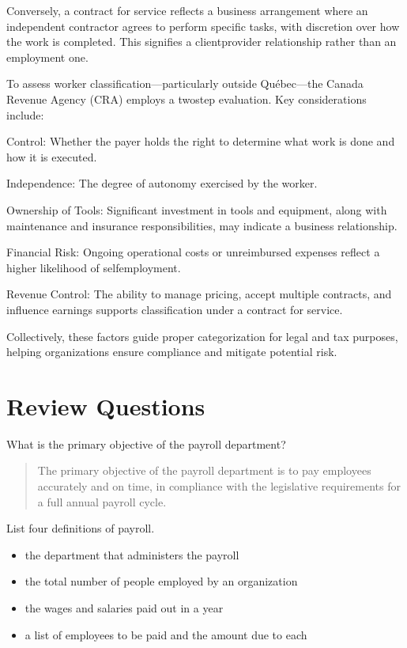 \documentclass[letterpaper,10pt,english]{sphinxmanual}
\begin{document}
\sphinxAtStartPar
Conversely, a contract for service reflects a business arrangement where an independent contractor agrees to perform specific
tasks, with discretion over how the work is completed. This signifies a client\sphinxhyphen{}provider relationship rather than an employment
one.

\sphinxAtStartPar
To assess worker classification—particularly outside Québec—the Canada Revenue Agency (CRA) employs a two\sphinxhyphen{}step evaluation. Key
considerations include:

\sphinxAtStartPar
Control: Whether the payer holds the right to determine what work is done and how it is executed.

\sphinxAtStartPar
Independence: The degree of autonomy exercised by the worker.

\sphinxAtStartPar
Ownership of Tools: Significant investment in tools and equipment, along with maintenance and insurance responsibilities, may indicate a business relationship.

\sphinxAtStartPar
Financial Risk: Ongoing operational costs or unreimbursed expenses reflect a higher likelihood of self\sphinxhyphen{}employment.

\sphinxAtStartPar
Revenue Control: The ability to manage pricing, accept multiple contracts, and influence earnings supports classification under a contract for service.

\sphinxAtStartPar
Collectively, these factors guide proper categorization for legal and tax purposes, helping organizations ensure compliance and mitigate potential risk.


\section{Review Questions}
\label{\detokenize{compliance:review-questions}}
\sphinxAtStartPar
What is the primary objective of the payroll department?
\begin{quote}

\sphinxAtStartPar
The primary objective of the payroll department is to pay employees accurately and
on time, in compliance with the legislative requirements for a full annual payroll
cycle.
\end{quote}

\sphinxAtStartPar
List four definitions of payroll.
\begin{itemize}
\item {} 
\sphinxAtStartPar
the department that administers the payroll

\item {} 
\sphinxAtStartPar
the total number of people employed by an organization

\item {} 
\sphinxAtStartPar
the wages and salaries paid out in a year

\item {} 
\sphinxAtStartPar
a list of employees to be paid and the amount due to each

\end{itemize}
\end{document}
